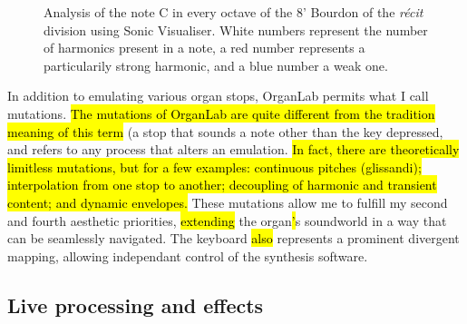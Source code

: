 \documentclass[12pt,twoside,maitrise]{dms_ks}
\theoremstyle{definition}
\begin{document}
{\begin{figure}[h]
    \centering
	\caption{Analysis of the note C in every octave of the 8' Bourdon of the \textit{récit} division using Sonic Visualiser. White numbers represent the number of harmonics present in a note, a red number represents a particularily strong harmonic, and a blue number a weak one.}
    \label{fig:bourdon_analysis}
\end{figure}


In addition to emulating various organ stops, OrganLab permits what I call mutations. 
\hl{The mutations of OrganLab are quite different from the tradition meaning of this term} (a stop that sounds a note other than the key depressed, and refers to any process that alters an emulation.  
\hl{In fact, there are theoretically limitless mutations, but for a few examples: continuous pitches (glissandi); interpolation from one stop to another; decoupling of harmonic and transient content; and dynamic envelopes.} 
These mutations allow me to fulfill my second and fourth aesthetic priorities, \hl{extending} the organ\hl{'}s soundworld in a way that can be seamlessly navigated. 
The keyboard \hl{also} represents a prominent divergent mapping, allowing independant control of the synthesis software.  


\subsection{Live processing and effects}

}
\end{document}

